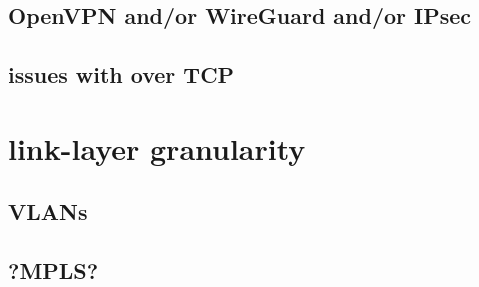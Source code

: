 \subsection{OpenVPN and/or WireGuard and/or IPsec}
\subsection{issues with over TCP}

\section{link-layer granularity}

\subsection{VLANs}

\subsection{?MPLS?}


